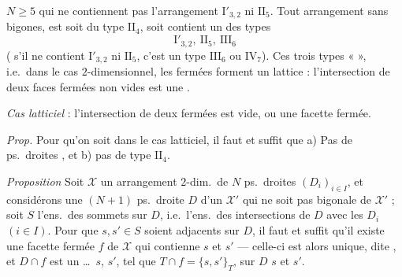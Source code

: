 \documentclass[11pt,a4paper]{article}
\begin{document}
$N \geq 5$ qui ne contiennent pas l'arrangement $\mathrm{I}'_{3,2}$ ni $\mathrm{II}_5$. Tout arrangement sans bigones,  est soit du type $\mathrm{II}_4$, soit contient un des types
\[
\boxed{\mathrm{I}'_{3,2},\ \mathrm{II}_5,\ \mathrm{III}_6}
\]
( s'il ne contient $\mathrm{I}'_{3,2}$ ni $\mathrm{II}_5$, c'est un type $\mathrm{III}_6$ ou $\mathrm{IV}_7$). Ces trois types  «  », i.e.\ dans le cas $2$-dimensionnel, les  fermées forment un lattice : \struck{\ill{}} l'intersection de deux faces fermées non vides est une .

\emph{Cas latticiel} : l'intersection de deux  fermées est vide, ou une facette fermée.

\emph{Prop.} Pour qu'on soit dans le cas latticiel, il faut et suffit que a) Pas de ps.\ droites , et b) pas de type $\mathrm{II}_4$.

\emph{Proposition} Soit $\mathcal{X}$ un arrangement $2$-dim.\ de $N$ ps.\ droites $(D_i)_{i \in I}$, et considérons une $(N+1)$ ps.\ droite $D$ d'un $\mathcal{X}'$ qui ne soit pas bigonale de $\mathcal{X}'$ ; soit $S$ l'ens.\ des sommets sur $D$, i.e.\ l'ens.\ des intersections de $D$ avec les $D_i$ $(i \in I)$.    Pour que $s, s' \in S$ soient adjacents sur $D$, il faut et suffit qu'il existe une facette fermée $f$ de $\mathcal{X}$ qui contienne $s$ et $s'$ --- celle-ci est alors unique, dite , et $D \cap f$ est un \ill{} \ldots\ $s$, $s'$, tel que $T \cap f = \lbrace s, s' \rbrace_T$, \ill{} sur $D$  $s$ et $s'$.
\end{document}
